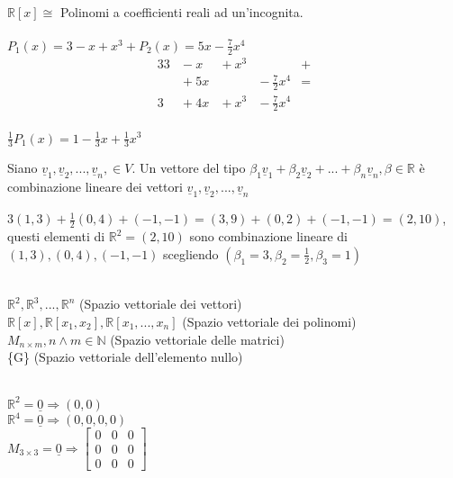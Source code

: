 \begin{es}
	$\mathbb{R}[x] \cong$ Polinomi a coefficienti reali ad un'incognita.\\\\
	$P_{1}(x)=3-x+x^{3} + P_{2}(x)=5x-\frac{7}{2}x^{4}$
	\begin{alignat*}{3}
		3 &{}- x&{}+ x^{3}&  &{}+\\
		  &{}+ 5x&{} &{}- \frac{7}{2}x^{4}&{}=\\
		3 &{}+ 4x&{}+ x^{3}&{}- \frac{7}{2}x^{4}& 
	\end{alignat*}\\
	$\frac{1}{3}P_{1}(x)=1-\frac{1}{3}x+\frac{1}{3}x^{3}$
\end{es}

\begin{definizione}
	Siano $\underline{v}_{1},\underline{v}_{2},...,\underline{v}_{n}, \in V$. Un vettore del tipo $\beta_1 \underline{v} _1+\beta_2 \underline{v} _2+...+\beta_n \underline{v} _n, \beta\in \mathbb{R}$ è combinazione lineare dei vettori $\underline{v} _{1},\underline{v} _{2},...,\underline{v} _{n}$
	\begin{es}
		$3(1,3)+\frac{1}{2}(0,4)+(-1,-1)=(3,9)+(0,2)+(-1,-1)=(2,10)$, questi elementi di $\mathbb{R}^2=(2,10)$ sono combinazione lineare di $(1,3),(0,4),(-1,-1)$ scegliendo $(\beta_1=3, \beta_2=\frac{1}{2}, \beta_3=1)$
	\end{es}
\end{definizione}

\begin{es}
	\phantom{}\\
    $\mathbb{R}^2, \mathbb{R}^3,...,\mathbb{R}^n$ (Spazio vettoriale dei vettori)\\
    $\mathbb{R}[x], \mathbb{R}[x_1,x_2], \mathbb{R}[x_1,...,x_n]$ (Spazio vettoriale dei polinomi)\\
    $M_{n\times m}, n\wedge m\in \mathbb{N}$ (Spazio vettoriale delle matrici)\\
    \{G\} (Spazio vettoriale dell'elemento nullo)
\end{es}

\begin{es}
	\phantom{}\\
	$\mathbb{R}^2=\underline{0} \Rightarrow (0,0)$\\
	$\mathbb{R}^4=\underline{0} \Rightarrow (0,0,0,0)$\\
	$M_{3\times3}=\underline{0} \Rightarrow 
	\begin{bmatrix}
    0 & 0 & 0 \\
	0 & 0 & 0 \\
	0 & 0 & 0
	\end{bmatrix}$
\end{es}

